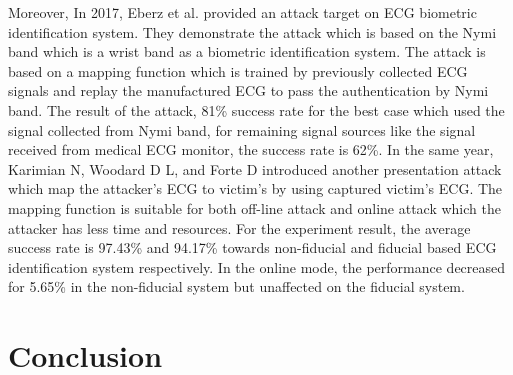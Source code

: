 \documentclass[a4paper,12pt]{article}
\begin{document}
Moreover, In 2017, Eberz et al.  \autocite{Eberz:2017broken} provided an attack target on ECG biometric identification system. They demonstrate the attack which is based on the Nymi band which is a wrist band as a biometric identification system. The attack is based on a mapping function which is trained by previously collected ECG signals and replay the manufactured ECG to pass the authentication by Nymi band. The result of the attack, 81\% success rate for the best case which used the signal collected from Nymi band, for remaining signal sources like the signal received from medical ECG monitor, the success rate is 62\%. In the same year, Karimian N, Woodard D L, and Forte D introduced another presentation attack \autocite{Karimian:2017vulnerability} which map the attacker's ECG to victim's by using captured victim's ECG. The mapping function is suitable for both off-line attack and online attack which the attacker has less time and resources. For the experiment result, the average success rate is 97.43\% and 94.17\% towards non-fiducial and fiducial based ECG identification system respectively. In the online mode, the performance decreased for 5.65\% in the non-fiducial system but unaffected on the fiducial system.

\section{Conclusion}

\printbibliography
\end{document}
